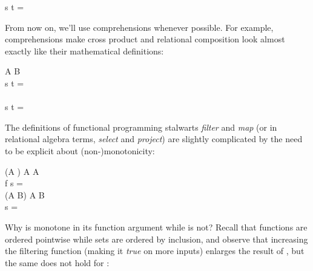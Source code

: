 \begin{code}
  \mvar s \cap \mvar t =
\end{code}

\noindent From now on, we'll use comprehensions whenever possible. For example, comprehensions make cross product and relational composition look almost exactly like their mathematical definitions:

\begin{code}
  \pwild \x \pwild \isa \tseteq A \to \tseteq B \to {}\\
  \mvar s \x \mvar t =
  \\[\betweenfunctionskip]
  \pwild \relcomp \pwild \isa
  \to {}
  \to {}\\
  \mvar s \relcomp \mvar t = 
\end{code}

\noindent
The definitions of functional programming stalwarts \emph{filter} and \emph{map}
(or in relational algebra terms, \emph{select} and \emph{project}) are slightly
complicated by the need to be explicit about
(non-\nolinebreak[4])\linebreak[0]monotonicity:

\newcommand{\kernf}{\kern1.67pt f}
\newcommand{\kernfpost}{\kern.3pt}
\renewcommand{\kernf}{f}
\renewcommand{\kernfpost}{\kern.4pt}

\begin{code}
   \isa (\iso \eqt A \to \tbool) \to \tseteq A \to \tseteq A\\
   \<\mvar f \<\mvar s =
  \\[\betweenfunctionskip]
   \isa \iso(\iso \eqt A \to \eqt B) \to \tseteq A \to \tseteq B\\
   \<\pboxvar{\kernf\kernfpost} \<\mvar s = \esetfor{\dvar{\kernf}\<\ebox{\dvar x}}{\dvar x \in \mvar s}
\end{code}

\noindent
Why is  monotone in its function argument while  is not? Recall that functions are ordered pointwise while sets are ordered by inclusion, and observe that increasing the filtering function (making it \emph{true} on more inputs) enlarges the result of , but the same does not hold for : 

